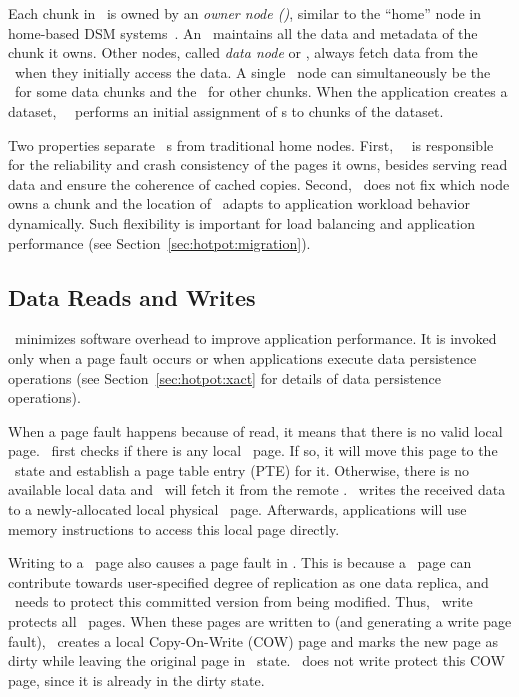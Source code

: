 Each chunk in \hotpot\ is owned by an {\em owner node (\on)},
similar to the ``home'' node in home-based DSM systems~\cite{HLRC}.
An \on\ maintains all the data and metadata of the chunk it owns.
Other nodes, called {\em data node} or {\em \dn}, always fetch data from the \on\
when they initially access the data.
A single \hotpot\ node can simultaneously be the \on\ for some data chunks and the \dn\ for other chunks.
When the application creates a dataset, 
\hotpot\ \cd\ performs an initial assignment of \on{}s to chunks of the dataset.

Two properties separate \hotpot\ \on{}s from traditional home nodes.
First, %
\hotpot\ \on\ is responsible for the reliability and crash consistency of the pages it owns,
besides serving read data and ensure the coherence of cached copies.
Second, \hotpot\ does not fix which node owns a chunk
and the location of \on\ adapts to application workload behavior dynamically.
Such flexibility is important for load balancing and application performance (see Section~\ref{sec:hotpot:migration}).

\subsection{Data Reads and Writes}
\label{sec:hotpot:readwrite}

\hotpot\ minimizes software overhead to improve application performance.
It is invoked only when a page fault occurs or when 
applications execute data persistence operations (see Section~\ref{sec:hotpot:xact} for details of data persistence operations).


When a page fault happens because of read, 
it means that there is no valid local page.
\hotpot\ first checks if there is any local \redundant\ page.
If so, it will move this page to the \committed\ state and establish a page table entry (PTE) for it.
Otherwise, there is no available local data and 
\hotpot\ will fetch it from the remote \on.
\hotpot\ writes the received data to a newly-allocated local physical \nvm\ page.
Afterwards, applications will use memory instructions to access this local page directly.


Writing to a \committed\ page also causes a page fault in \hotpot. 
This is because a \committed\ page can contribute towards user-specified degree of replication as one data replica,
and \hotpot\ needs to protect this committed version from being modified.
Thus, \hotpot\ write protects all \committed\ pages.
When these pages are written to (and generating a write page fault), 
\hotpot\ creates a local Copy-On-Write (COW) page
and marks the new page as dirty while leaving
the original page in \committed\ state.
\hotpot\ does not write protect this COW page, since it is already in the dirty state.

